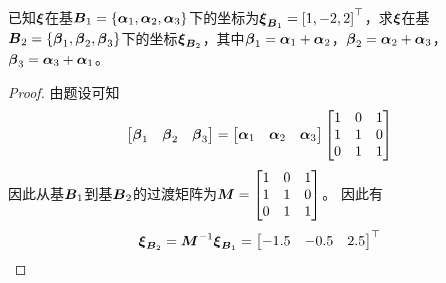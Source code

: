 \begin{problem}
已知\(\boldsymbol{\xi}\)在基\(\boldsymbol{B}_1=\left\{\boldsymbol{\alpha}_1,\boldsymbol{\alpha}_2,\boldsymbol{\alpha}_3 \right\}\)下的坐标为\(\boldsymbol{\xi}_{\boldsymbol{B}_1}=\left[ 1,-2,2 \right]^\top\)，求\(\boldsymbol{\xi}\)在基\(\boldsymbol{B}_2=\left\{\boldsymbol{\beta}_1,\boldsymbol{\beta}_2,\boldsymbol{\beta}_3 \right\}\)下的坐标\(\boldsymbol{\xi}_{\boldsymbol{B}_2}\)，其中\(\boldsymbol{\beta}_1=\boldsymbol{\alpha}_1+\boldsymbol{\alpha}_2\)，\(\boldsymbol{\beta}_2=\boldsymbol{\alpha}_2+\boldsymbol{\alpha}_3\)，\(\boldsymbol{\beta}_3=\boldsymbol{\alpha}_3+\boldsymbol{\alpha}_1\)。
\end{problem}
\begin{proof}
    由题设可知
    \begin{equation*}
        \begin{bmatrix}\boldsymbol{\beta}_1&\boldsymbol{\beta}_2&\boldsymbol{\beta}_3\end{bmatrix}=
        \begin{bmatrix}\boldsymbol{\alpha}_1&\boldsymbol{\alpha}_2&\boldsymbol{\alpha}_3\end{bmatrix}
        \begin{bmatrix}
            1 & 0 & 1 \\
            1 & 1 & 0 \\
            0 & 1 & 1
        \end{bmatrix}
    \end{equation*}
    因此从基\(\boldsymbol{B}_1\)到基\(\boldsymbol{B}_2\)的过渡矩阵为\(\boldsymbol{M}=\begin{bmatrix}1&0&1\\1&1&0\\0&1&1\end{bmatrix}\)。
    因此有
    \begin{equation*}
        \boldsymbol{\xi}_{\boldsymbol{B}_2}={\boldsymbol{M}}^{-1}\boldsymbol{\xi}_{\boldsymbol{B}_1}=\begin{bmatrix}-1.5&-0.5&2.5\end{bmatrix}^\top
    \end{equation*}
\end{proof}

